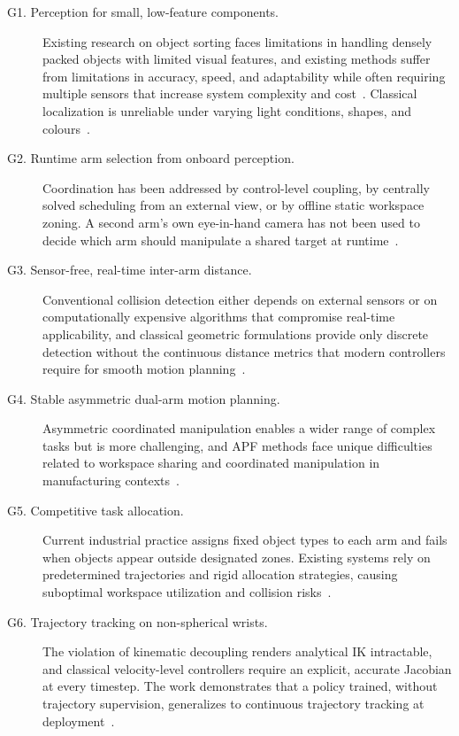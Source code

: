 \begin{description}
    \item[G1. Perception for small, low-feature components.] Existing research on object sorting
    faces limitations in handling densely packed objects with limited visual features, and existing
    methods suffer from limitations in accuracy, speed, and adaptability while often requiring
    multiple sensors that increase system complexity and cost~\citep{sk2024bolthandling}. Classical
    localization is unreliable under varying light conditions, shapes, and
    colours~\citep{sk2024boltsorting}.

    \item[G2. Runtime arm selection from onboard perception.] Coordination has been addressed by
    control-level coupling, by centrally solved scheduling from an external view, or by offline
    static workspace zoning. A second arm's own eye-in-hand camera has not been used to decide which
    arm should manipulate a shared target at runtime~\citep{sk2025sharedvision}.

    \item[G3. Sensor-free, real-time inter-arm distance.] Conventional collision detection either
    depends on external sensors or on computationally expensive algorithms that compromise real-time
    applicability, and classical geometric formulations provide only discrete detection without the
    continuous distance metrics that modern controllers require for smooth motion
    planning~\citep{sk2025distance,surya2025iapf}.

    \item[G4. Stable asymmetric dual-arm motion planning.] Asymmetric coordinated manipulation
    enables a wider range of complex tasks but is more challenging, and APF methods face unique
    difficulties related to workspace sharing and coordinated manipulation in manufacturing
    contexts~\citep{surya2025iapf,sk2025competitive}.

    \item[G5. Competitive task allocation.] Current industrial practice assigns fixed object types
    to each arm and fails when objects appear outside designated zones. Existing systems rely on
    predetermined trajectories and rigid allocation strategies, causing suboptimal workspace
    utilization and collision risks~\citep{sk2025competitive}.

    \item[G6. Trajectory tracking on non-spherical wrists.] The violation of kinematic decoupling
    renders analytical IK intractable, and classical velocity-level controllers require an explicit,
    accurate Jacobian at every timestep. The work demonstrates that a policy trained, without trajectory supervision, generalizes to continuous trajectory
    tracking at deployment~\citep{sk2025diktracking}.


\end{description}
